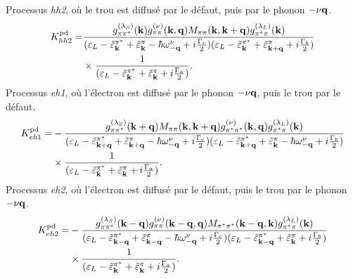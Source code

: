 Processus \textit{hh2}, où le trou est diffusé par le défaut, puis par le phonon $-\nu\mathbf{q}$.
\begin{equation}
    \begin{split}
    K_{hh2}^{\text{pd}} = &\frac{g^{(\lambda_S)}_{\pi\pi^*}(\mathbf{k})g^{(\nu)}_{\pi\pi}(\mathbf{k},\mathbf{q})M_{\pi\pi}(\mathbf{k},\mathbf{k}+\mathbf{q})g_{\pi^*\pi}^{(\lambda_L)}(\mathbf{k})}{(\varepsilon_L-\tilde{\varepsilon}_{\mathbf{k}}^{\pi^*}+\tilde{\varepsilon}_{\mathbf{k}}^\pi-\hbar\omega_{-\mathbf{q}}^\nu+i\frac{\Gamma_c}{2})(\varepsilon_L-\tilde{\varepsilon}_{\mathbf{k}}^{\pi^*}+\tilde{\varepsilon}_{\mathbf{k}+\mathbf{q}}^\pi+i\frac{\Gamma_b}{2})}\\
    &\times\frac{1}{(\varepsilon_L-\tilde{\varepsilon}_{\mathbf{k}}^{\pi^*}+\tilde{\varepsilon}_{\mathbf{k}}^\pi+i\frac{\Gamma_a}{2})}.\label{eqn:pd_hh2}
    \end{split}
\end{equation}
Processus \textit{eh1}, où l'électron est diffusé par le phonon $-\nu\mathbf{q}$, puis le trou par le défaut.
\begin{equation}
    \begin{split}
    K_{eh1}^{\text{pd}} = &-\frac{g^{(\lambda_S)}_{\pi\pi^*}(\mathbf{k}+\mathbf{q})M_{\pi\pi}(\mathbf{k}, \mathbf{k}+\mathbf{q})g_{\pi^*\pi^*}^{(\nu)}(\mathbf{k},\mathbf{q})g_{\pi^*\pi}^{(\lambda_L)}(\mathbf{k})}{(\varepsilon_L-\tilde{\varepsilon}_{\mathbf{k}+\mathbf{q}}^{\pi^*}+\tilde{\varepsilon}_{\mathbf{k}+\mathbf{q}}^\pi-\hbar\omega_{-\mathbf{q}}^\nu+i\frac{\Gamma_c}{2})(\varepsilon_L-\tilde{\varepsilon}_{\mathbf{k}+\mathbf{q}}^{\pi^*}+\tilde{\varepsilon}_{\mathbf{k}}^\pi-\hbar\omega_{-\mathbf{q}}^\nu+i\frac{\Gamma_b}{2})}\\
    &\times\frac{1}{(\varepsilon_L-\tilde{\varepsilon}_{\mathbf{k}}^{\pi^*}+\tilde{\varepsilon}_{\mathbf{k}}^\pi+i\frac{\Gamma_a}{2})}.\label{eqn:pd_eh1}
    \end{split}
\end{equation}
Processus \textit{eh2}, où l'électron est diffusé par le défaut, puis le trou par le phonon $-\nu\mathbf{q}$.
\begin{equation}
    \begin{split}
    K_{eh2}^{\text{pd}} = &-\frac{g^{(\lambda_S)}_{\pi\pi^*}(\mathbf{k}-\mathbf{q})g^{(\nu)}_{\pi\pi}(\mathbf{k}-\mathbf{q},\mathbf{q})M_{\pi^*\pi^*}(\mathbf{k}-\mathbf{q},\mathbf{k})g_{\pi^*\pi}^{(\lambda_L)}(\mathbf{k})}{(\varepsilon_L-\tilde{\varepsilon}_{\mathbf{k}-\mathbf{q}}^{\pi^*}+\tilde{\varepsilon}_{\mathbf{k}-\mathbf{q}}^\pi-\hbar\omega_{-\mathbf{q}}^\nu+i\frac{\Gamma_c}{2})(\varepsilon_L-\tilde{\varepsilon}_{\mathbf{k}-\mathbf{q}}^{\pi^*}+\tilde{\varepsilon}_{\mathbf{k}}^\pi+i\frac{\Gamma_b}{2})}\\
    &\times\frac{1}{(\varepsilon_L-\tilde{\varepsilon}_{\mathbf{k}}^{\pi^*}+\tilde{\varepsilon}_{\mathbf{k}}^\pi+i\frac{\Gamma_a}{2})}.\label{eqn:pd_eh2}
    \end{split}
\end{equation}
